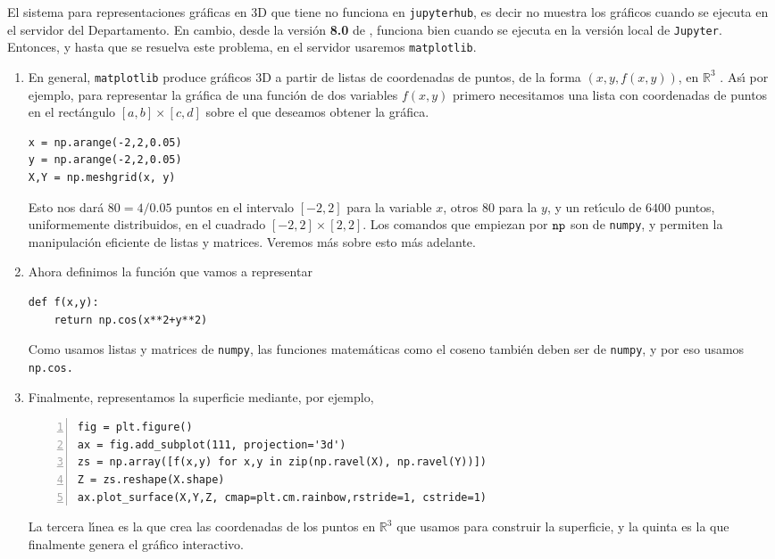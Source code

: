 El sistema para representaciones gr\'aficas en 3D que tiene {\sage} no funciona en {\tt jupyterhub}, es decir no muestra los gr\'aficos cuando se ejecuta en el servidor del Departamento. En cambio, desde la versi\'on {\bf 8.0} de {\sage},  funciona bien cuando se ejecuta en la versi\'on local de {\tt Jupyter}. Entonces, y hasta que se resuelva este problema, en el servidor  usaremos {\tt matplotlib}.

\begin{enumerate}
\item En general, {\tt matplotlib} produce gr\'aficos 3D a partir de listas de coordenadas de puntos, de la forma $(x,y,f(x,y))$,  en $\mathbb{R}^3$ . As\'{\i} por ejemplo, para representar la gr\'afica de una funci\'on de dos variables  $f(x,y)$ primero necesitamos una lista con coordenadas de puntos en el rect\'angulo $[a,b]\times[c,d]$ sobre el que deseamos obtener la gr\'afica. 

\begin{lstlisting}[numbers=none]
x = np.arange(-2,2,0.05)
y = np.arange(-2,2,0.05)
X,Y = np.meshgrid(x, y)
\end{lstlisting}	

Esto nos dar\'a $80=4/0.05$ puntos en el intervalo $[-2,2]$ para la variable $x$, otros $80$ para la $y$, y  un ret\'{\i}culo de $6400$ puntos, uniformemente distribuidos,  en el  cuadrado $[-2,2]\times [2,2]$. Los comandos que empiezan por $\tt np$ son de {\tt numpy}, y permiten la manipulaci\'on eficiente de listas y matrices. Veremos m\'as sobre esto m\'as adelante.

\item Ahora definimos la funci\'on que vamos a representar
\begin{lstlisting}[numbers=none]
def f(x,y):
	return np.cos(x**2+y**2)
\end{lstlisting}	
	
Como usamos listas y matrices de {\tt numpy}, las funciones matem\'aticas como el coseno tambi\'en deben ser de {\tt numpy}, y por eso usamos {\tt np.cos.}
\item Finalmente, representamos la superficie mediante, por ejemplo, 
\begin{lstlisting}[numbers=left]
fig = plt.figure()
ax = fig.add_subplot(111, projection='3d')
zs = np.array([f(x,y) for x,y in zip(np.ravel(X), np.ravel(Y))])
Z = zs.reshape(X.shape)
ax.plot_surface(X,Y,Z, cmap=plt.cm.rainbow,rstride=1, cstride=1)
\end{lstlisting}	


La tercera l\'{\i}nea es la que crea las coordenadas de los puntos en $\mathbb{R}^3$ que usamos para construir la superficie, y la quinta es la que finalmente genera el gr\'afico interactivo.




\end{enumerate}
